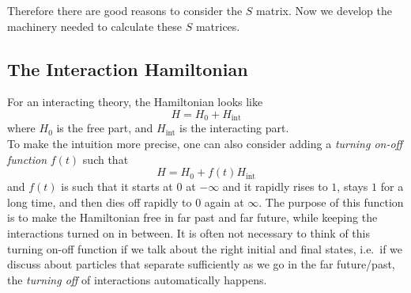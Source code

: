 \documentclass[11pt]{article}
\numberwithin{equation}{section}
\begin{document}
    Therefore there are good reasons to consider the \(S\) matrix. Now we develop the machinery needed to calculate these \(S\) matrices. 

    \subsection{The Interaction Hamiltonian}
    For an interacting theory, the Hamiltonian looks like 
    \begin{equation*}
        H = H_0 + H_{\text{int}}
    \end{equation*}
    where \(H_0\) is the free part, and \(H_{\text{int}}\) is the interacting part. \\
    To make the intuition more precise, one can also consider adding a \textit{turning on-off function} \(f(t)\) such that 
    \begin{equation*}
        H = H_0 + f(t) H_{\text{int}}
    \end{equation*}
    and \(f(t)\) is such that it starts at \(0\) at \(-\infty\) and it rapidly rises to \(1\), stays \(1\) for a long time, and then dies off rapidly to \(0\) again at \(\infty\). The purpose of this function is to make the Hamiltonian free in far past and far future, while keeping the interactions turned on in between. It is often not necessary to think of this turning on-off function if we talk about the right initial and final states, i.e.\ if we discuss about particles that separate sufficiently as we go in the far future/past, the \textit{turning off} of interactions automatically happens.\\
\end{document}

